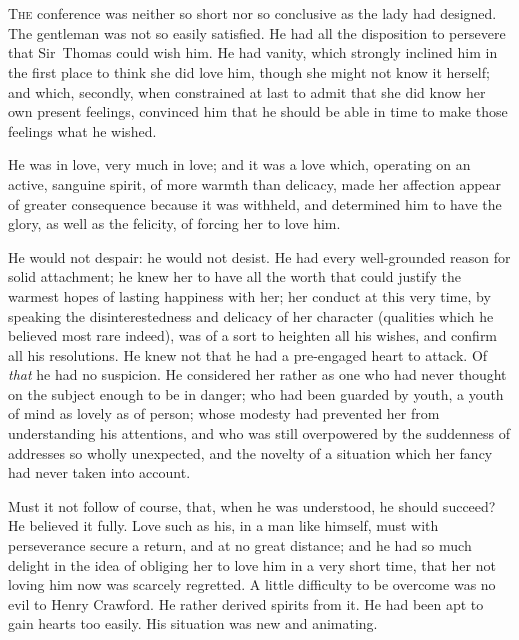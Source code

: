 \chapter[Chapter \thechapter]{} 

 \lettrine[lraise=0.3]{T}{he} conference was neither so short nor so conclusive as the lady had designed. The gentleman was not so easily satisfied. He had all the disposition to persevere that Sir~Thomas could wish him. He had vanity, which strongly inclined him in the first place to think she did love him, though she might not know it herself; and which, secondly, when constrained at last to admit that she did know her own present feelings, convinced him that he should be able in time to make those feelings what he wished.

He was in love, very much in love; and it was a love which, operating on an active, sanguine spirit, of more warmth than delicacy, made her affection appear of greater consequence because it was withheld, and determined him to have the glory, as well as the felicity, of forcing her to love him.

He would not despair: he would not desist. He had every well-grounded reason for solid attachment; he knew her to have all the worth that could justify the warmest hopes of lasting happiness with her; her conduct at this very time, by speaking the disinterestedness and delicacy of her character (qualities which he believed most rare indeed), was of a sort to heighten all his wishes, and confirm all his resolutions. He knew not that he had a pre-engaged heart to attack. Of \textit{that}  he had no suspicion. He considered her rather as one who had never thought on the subject enough to be in danger; who had been guarded by youth, a youth of mind as lovely as of person; whose modesty had prevented her from understanding his attentions, and who was still overpowered by the suddenness of addresses so wholly unexpected, and the novelty of a situation which her fancy had never taken into account.

Must it not follow of course, that, when he was understood, he should succeed? He believed it fully. Love such as his, in a man like himself, must with perseverance secure a return, and at no great distance; and he had so much delight in the idea of obliging her to love him in a very short time, that her not loving him now was scarcely regretted. A little difficulty to be overcome was no evil to Henry Crawford. He rather derived spirits from it. He had been apt to gain hearts too easily. His situation was new and animating.

